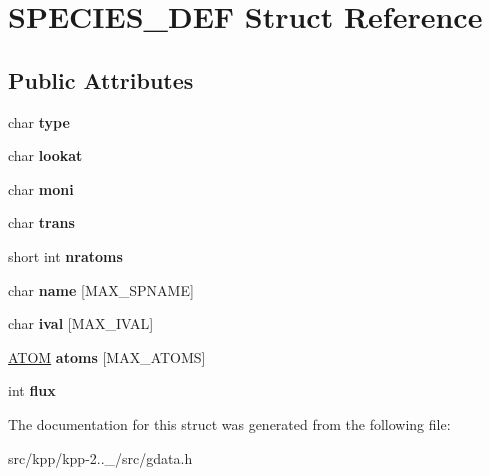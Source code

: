 \hypertarget{structSPECIES__DEF}{}\section{S\+P\+E\+C\+I\+E\+S\+\_\+\+D\+EF Struct Reference}
\label{structSPECIES__DEF}
\subsection*{Public Attributes}
\begin{DoxyCompactItemize}
\item 
\mbox{\label{structSPECIES__DEF_a0ea1cd05bdfdf96b6fe84683e8bb3926}} 
char {\bfseries type}
\item 
\mbox{\label{structSPECIES__DEF_aacf03c9e6eb58a05bbb1228ed5c88456}} 
char {\bfseries lookat}
\item 
\mbox{\label{structSPECIES__DEF_a1182c49807eb6d7c148a0c806d602d2b}} 
char {\bfseries moni}
\item 
\mbox{\label{structSPECIES__DEF_a5c99c2036c04e479e9edea17ff525798}} 
char {\bfseries trans}
\item 
\mbox{\label{structSPECIES__DEF_ac7434c26f8e606d9a2dbbf5ffc767fed}} 
short int {\bfseries nratoms}
\item 
\mbox{\label{structSPECIES__DEF_aef68fcb4ce2795b655e950cadbc44d28}} 
char {\bfseries name} \mbox{[}M\+A\+X\+\_\+\+S\+P\+N\+A\+ME\mbox{]}
\item 
\mbox{\label{structSPECIES__DEF_acfe991bbc8aa1dd8b381065797cd74b5}} 
char {\bfseries ival} \mbox{[}M\+A\+X\+\_\+\+I\+V\+AL\mbox{]}
\item 
\mbox{\label{structSPECIES__DEF_a19b6d1c7489356fe26568954dd6041c3}} 
\mbox{\hyperlink{structATOM}{A\+T\+OM}} {\bfseries atoms} \mbox{[}M\+A\+X\+\_\+\+A\+T\+O\+MS\mbox{]}
\item 
\mbox{\label{structSPECIES__DEF_ad9d0e4a8306b7e57c986a7e3874ef15d}} 
int {\bfseries flux}
\end{DoxyCompactItemize}


The documentation for this struct was generated from the following file\+:\begin{DoxyCompactItemize}
\item 
src/kpp/kpp-\/2..\+\_/src/gdata.\+h\end{DoxyCompactItemize}
